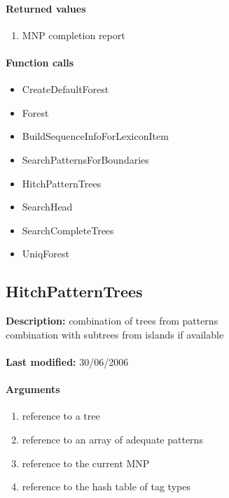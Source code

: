 \paragraph{Returned values}
\begin{enumerate}
\item MNP completion report
\end{enumerate}

\paragraph{Function calls}
\begin{itemize}
\item CreateDefaultForest
\item Forest
\item BuildSequenceInfoForLexiconItem
\item SearchPatternsForBoundaries
\item HitchPatternTrees
\item SearchHead
\item SearchCompleteTrees
\item UniqForest
\end{itemize}

\subsection{HitchPatternTrees}
\textbf{Description:} combination of trees from patterns\\
combination with subtrees from islands if available\\
\\\textbf{Last modified:} 30/06/2006

\paragraph{Arguments}
\begin{enumerate}
\item reference to a tree
\item reference to an array of adequate patterns
\item reference to the current MNP
\item reference to the hash table of tag types
\end{enumerate}

